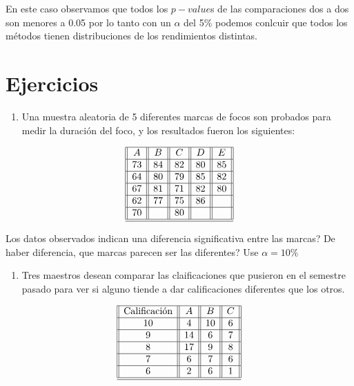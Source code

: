 \documentclass[
  a4paper,
  oneside,
  openany]{book}
\providecommand{\tightlist}{%
  \setlength{\itemsep}{0pt}\setlength{\parskip}{0pt}}
\begin{document}
En este caso observamos que todos los \(p-value\)s de las comparaciones dos a dos son menores a 0.05 por lo tanto con un \(\alpha\) del 5\% podemos conlcuir que todos los métodos tienen distribuciones de los rendimientos distintas.

\hypertarget{ejercicios-5}{%
\section{Ejercicios}\label{ejercicios-5}}

\begin{enumerate}
\def\labelenumi{\arabic{enumi}.}
\tightlist
\item
  Una muestra aleatoria de 5 diferentes marcas de focos son probados para medir la duración del foco, y los resultados fueron los siguientes:
\end{enumerate}

\[
\begin{array}{||c| |c| |c| |c||c||} 
\hline 
A & B&C&D&E \\ 
 \hline
73&84&82&80&85\\
 \hline
64&80&79&85&82\\
 \hline
67&81&71&82&80\\
 \hline
62&77&75&86&\\
 \hline
70&&80&&\\
\hline
\hline
\end{array}
\]

Los datos observados indican una diferencia significativa entre las marcas? De haber diferencia, que marcas parecen ser las diferentes? Use \(\alpha=10\%\)

\begin{enumerate}
\def\labelenumi{\arabic{enumi}.}
\setcounter{enumi}{1}
\tightlist
\item
  Tres maestros desean comparar las claificaciones que pusieron en el semestre pasado para ver si alguno tiende a dar calificaciones diferentes que los otros.
\end{enumerate}

\[
\begin{array}{||c| |c| |c| |c||} 
\hline 
\mbox{Calificación} & A & B&C \\  
 \hline
10&4&10&6\\
 \hline
9&14&6&7\\
 \hline
8&17&9&8\\
 \hline
7&6&7&6\\
 \hline
6&2&6&1\\
\hline
\hline
\end{array}
\]
\end{document}
